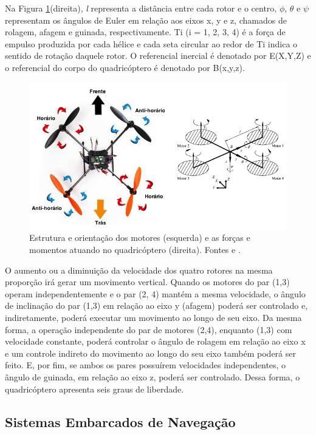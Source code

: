 \documentclass[a4paper, 12pt]{article}
\begin{document}
Na Figura \ref{fig:diag quad}(direita), \textit{l} representa a distância entre cada rotor e o centro, $\phi$, $\theta$ e $\psi$ representam os ângulos de Euler em relação aos eixos x, y e z, chamados de rolagem, afagem e guinada, respectivamente. Ti (i = 1, 2, 3, 4) é a força de empulso produzida por cada hélice e cada seta circular ao redor de Ti indica o sentido de rotação daquele rotor. O referencial inercial é denotado por E(X,Y,Z) e o referencial do corpo do quadricóptero é denotado por B(x,y,z). 

\begin{figure}[h]
	\centering
		\includegraphics[scale=0.5]{img/diagrama_quadricoptero.png}
	\caption{Estrutura e orientação dos motores (esquerda) e as forças e momentos atuando no quadricóptero (direita). Fontes \cite{quadblog} e \cite{Mian2008}.}
	\label{fig:diag quad}
\end{figure}

O aumento ou a diminuição da velocidade dos quatro rotores na mesma proporção irá gerar um movimento vertical. Quando os motores do par (1,3) operam independentemente e o par (2, 4) mantém a mesma velocidade, o ângulo de inclinação do par (1,3) em relação ao eixo y (afagem) poderá ser controlado e, indiretamente, poderá executar um movimento ao longo de seu eixo. Da mesma forma, a operação independente do par de motores (2,4), enquanto (1,3) com velocidade constante, poderá controlar o ângulo de rolagem em relação ao eixo x e um controle indireto do movimento ao longo do seu eixo também poderá ser feito. E, por fim, se ambos os pares possuírem velocidades independentes, o ângulo de guinada, em relação ao eixo z, poderá ser controlado. Dessa forma, o quadricóptero apresenta seis graus de liberdade. 

\subsection{Sistemas Embarcados de Navegação}
\end{document}
